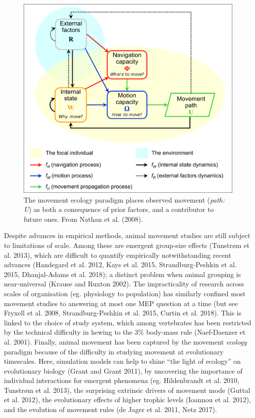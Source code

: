 \documentclass[]{scrartcl}
\begin{document}
\begin{linenumbers}
\begin{figure}
	\centering
	\includegraphics[width=0.7\linewidth]{fig02_nathan_etal_2008}
	\caption{The movement ecology paradigm places observed movement (\textit{path: U}) as both a consequence of prior factors, and a contributor to future ones. From Nathan et al. (2008).}
	\label{fig:fig02nathanetal2008}
\end{figure}

Despite advances in empirical methods, animal movement studies are still
subject to limitations of scale. Among these are emergent group-size
effects (Tunstrøm et al. 2013), which are difficult to quantify empirically
notwithstanding recent advances (Handegard et al. 2012, Kays et al.
2015, Strandburg-Peshkin et al. 2015, Dhanjal-Adams et al. 2018); a
distinct problem when animal grouping is near-universal (Krause and
Ruxton 2002). The impracticality of research across scales of
organisation (eg. physiology to population) has similarly confined most
movement studies to answering at most one MEP question at a time (but
see Fryxell et al. 2008, Strandburg-Peshkin et al. 2015, Curtin et al.
2018). This is linked to the choice of study system, which among
vertebrates has been restricted by the technical difficulty in hewing to
the 3\% body-mass rule (Naef-Daenzer et al. 2001). Finally, animal
movement has been captured by the movement \emph{ecology} paradigm
because of the difficulty in studying movement at evolutionary
timescales. Here, simulation models can help to shine ``the light of
ecology'' on evolutionary biology (Grant and Grant 2011), by uncovering
the importance of individual interactions for emergent phenomena (eg. Hildenbrandt
et al. 2010, Tunstrøm et al. 2013), the surprising extrinsic drivers of
movement mode (Guttal et al. 2012), the evolutionary effects of higher
trophic levels (Ioannou et al. 2012), and the evolution of movement
rules (de Jager et al. 2011, Netz 2017).




\end{linenumbers}
\end{document}
